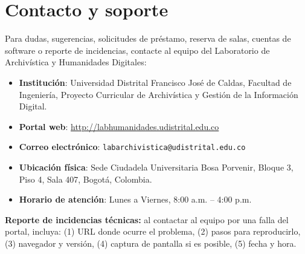 \documentclass[12pt,a4paper]{report}
\begin{document}
\chapter{Contacto y soporte}

Para dudas, sugerencias, solicitudes de préstamo, reserva de salas, cuentas de
software o reporte de incidencias, contacte al equipo del Laboratorio de
Archivística y Humanidades Digitales:

\begin{itemize}
  \item \textbf{Institución}: Universidad Distrital Francisco José de Caldas,
        Facultad de Ingeniería, Proyecto Curricular de Archivística y Gestión
        de la Información Digital.
  \item \textbf{Portal web}: \url{http://labhumanidades.udistrital.edu.co}
  \item \textbf{Correo electrónico}:
        \texttt{labarchivistica@udistrital.edu.co}
  \item \textbf{Ubicación física}: Sede Ciudadela Universitaria Bosa Porvenir,
        Bloque 3, Piso 4, Sala 407, Bogotá, Colombia.
  \item \textbf{Horario de atención}: Lunes a Viernes, 8:00 a.m. -- 4:00 p.m.
\end{itemize}

\begin{mdframed}[style=importantstyle]
  \textbf{Reporte de incidencias técnicas:} al contactar al equipo por una
  falla del portal, incluya: (1) URL donde ocurre el problema, (2) pasos
  para reproducirlo, (3) navegador y versión, (4) captura de pantalla si
  es posible, (5) fecha y hora.
\end{mdframed}
\end{document}
